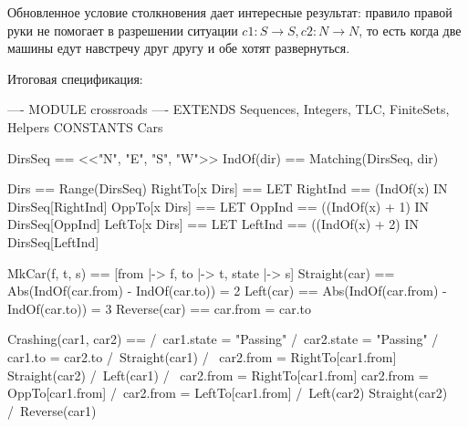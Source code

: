 \documentclass[14pt, openany]{book}
\begin{document}
Обновленное условие столкновения дает интересные результат: правило правой руки не помогает в разрешении ситуации \(c1: S \rightarrow S, c2: N \rightarrow N \), то есть когда две машины едут навстречу друг другу и обе хотят развернуться. 

Итоговая спецификация:
\begin{tla}
  ---- MODULE crossroads ----
EXTENDS Sequences, Integers, TLC, FiniteSets, Helpers
CONSTANTS Cars

DirsSeq == <<"N", "E", "S", "W">>
IndOf(dir) == Matching(DirsSeq, dir)

Dirs == Range(DirsSeq)
RightTo[x \in Dirs] == 
  LET RightInd == (IndOf(x) %
  IN DirsSeq[RightInd]
OppTo[x \in Dirs] ==
  LET OppInd == ((IndOf(x) + 1) %
  IN DirsSeq[OppInd]
LeftTo[x \in Dirs] == 
  LET LeftInd == ((IndOf(x) + 2) %
  IN DirsSeq[LeftInd] 

MkCar(f, t, s) == [from |-> f, to |-> t, state |-> s]
Straight(car) == Abs(IndOf(car.from) - IndOf(car.to)) = 2
Left(car) == Abs(IndOf(car.from) - IndOf(car.to)) = 3
Reverse(car) == car.from = car.to
  
Crashing(car1, car2) == 
  /\ car1.state = "Passing" 
  /\ car2.state = "Passing" 
  /\ \/ car1.to = car2.to  
     \/ /\ Straight(car1) 
        /\ \/ car2.from = RightTo[car1.from] 
           \/ Straight(car2)
     \/ /\ Left(car1)
        /\ \/ car2.from = RightTo[car1.from]
           \/ car2.from = OppTo[car1.from]
           \/ /\ car2.from = LeftTo[car1.from]
              /\ Left(car2) \/ Straight(car2)
     \/ /\ Reverse(car1)     
\end{tla}
\end{document}
